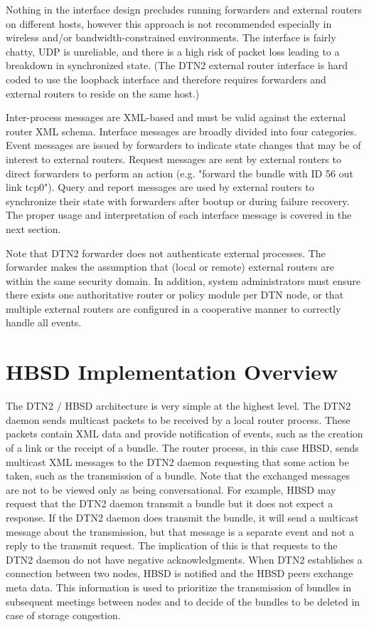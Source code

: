 Nothing in the interface design precludes running forwarders and external routers on different hosts, however this approach is not recommended especially in wireless and/or bandwidth-constrained environments. The interface is fairly chatty, UDP is unreliable, and there is a high risk of packet loss leading to a breakdown in synchronized state. (The DTN2 external router interface is hard coded to use the loopback interface and therefore requires forwarders and external routers to reside on the same host.)

Inter-process messages are XML-based and must be valid against the external router XML schema. Interface messages are broadly divided into four categories. Event messages are issued by forwarders to indicate state changes that may be of interest to external routers. Request messages are sent by external routers to direct forwarders to perform an action (e.g. "forward the bundle with ID 56 out link tcp0"). Query and report messages are used by external routers to synchronize their state with forwarders after bootup or during failure recovery. The proper usage and interpretation of each interface message is covered in the next section.

Note that DTN2 forwarder does not authenticate external processes. The forwarder makes the assumption that (local or remote) external routers are within the same security domain. In addition, system administrators must ensure there exists one authoritative router or policy module per DTN node, or that multiple external routers are configured in a cooperative manner to correctly handle all events.


\section{HBSD Implementation Overview}

The DTN2 / HBSD architecture is very simple at the highest level. The DTN2 daemon sends multicast packets 
to be received by a local router process. These packets contain XML
data and provide notification of events, such as the creation of a link or the receipt of a bundle.
The router process, in this case HBSD, sends multicast XML messages to the DTN2 daemon requesting that
some action be taken, such as the transmission of a bundle. Note that the exchanged messages
are not to be viewed only as being conversational. For example, HBSD may request that the DTN2 daemon
transmit a bundle but it does not expect a response. If the DTN2 daemon does transmit the bundle, it will send
a multicast message about the transmission, but that message is a separate event and not a
reply to the transmit request. The implication of this is that requests to the DTN2 daemon do not have negative
acknowledgments. When DTN2 establishes a connection between two nodes, HBSD is notified and the HBSD
peers exchange meta data. This information is used to prioritize the transmission of bundles in
subsequent meetings between nodes and to decide of the bundles to be deleted in case of storage congestion. 

